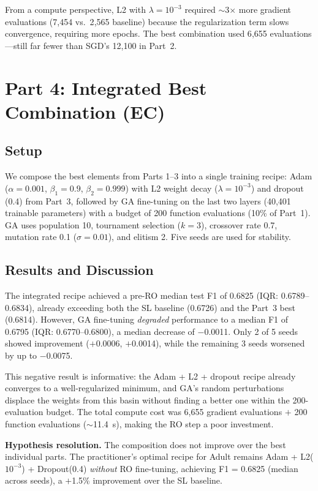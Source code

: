 \documentclass[10 pt, twocolumn]{article}
\begin{document}
From a compute perspective, L2 with $\lambda = 10^{-3}$ required $\sim$3$\times$ more gradient evaluations (7{,}454 vs.\ 2{,}565 baseline) because the regularization term slows convergence, requiring more epochs. The best combination used 6{,}655 evaluations---still far fewer than SGD's 12{,}100 in Part~2.

\section{Part 4: Integrated Best Combination (EC)}

\subsection{Setup}

We compose the best elements from Parts 1--3 into a single training recipe: Adam ($\alpha = 0.001$, $\beta_1 = 0.9$, $\beta_2 = 0.999$) with L2 weight decay ($\lambda = 10^{-3}$) and dropout (0.4) from Part~3, followed by GA fine-tuning on the last two layers (40{,}401 trainable parameters) with a budget of 200 function evaluations (10\% of Part~1). GA uses population 10, tournament selection ($k=3$), crossover rate 0.7, mutation rate 0.1 ($\sigma = 0.01$), and elitism 2. Five seeds are used for stability.

\subsection{Results and Discussion}

The integrated recipe achieved a pre-RO median test F1 of 0.6825 (IQR: 0.6789--0.6834), already exceeding both the SL baseline (0.6726) and the Part~3 best (0.6814). However, GA fine-tuning \textit{degraded} performance to a median F1 of 0.6795 (IQR: 0.6770--0.6800), a median decrease of $-$0.0011. Only 2 of 5 seeds showed improvement ($+$0.0006, $+$0.0014), while the remaining 3 seeds worsened by up to $-$0.0075.

This negative result is informative: the Adam + L2 + dropout recipe already converges to a well-regularized minimum, and GA's random perturbations displace the weights from this basin without finding a better one within the 200-evaluation budget. The total compute cost was 6{,}655 gradient evaluations $+$ 200 function evaluations ($\sim$11.4~s), making the RO step a poor investment.

\textbf{Hypothesis resolution.} The composition does not improve over the best individual parts. The practitioner's optimal recipe for Adult remains Adam + L2($10^{-3}$) + Dropout(0.4) \textit{without} RO fine-tuning, achieving F1 = 0.6825 (median across seeds), a $+$1.5\% improvement over the SL baseline.
\end{document}
